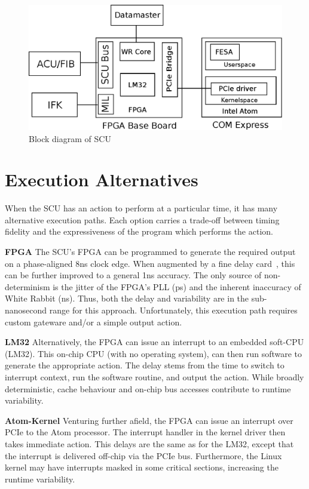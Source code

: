 \documentclass{JAC2003}
\begin{document}
\begin{figure}[t]
   \centering
   \includegraphics*[width=\columnwidth]{WEPD48f2}
   \caption{Block diagram of SCU}
\end{figure}


\section{Execution Alternatives}
When the SCU has an action to perform at a particular time, 
it has many alternative execution paths.
Each option carries a trade-off between timing fidelity and 
the expressiveness of the program which performs the action.

\textbf{FPGA} 
The SCU's FPGA can be programmed to generate the required output
on a phase-aligned 8ns clock edge. 
When augmented by a fine delay card~\cite{cern-fine-delay},
this can be further improved to a general 1ns accuracy.
The only source of non-determinism is the jitter of the FPGA's PLL (ps) 
and the inherent inaccuracy of White Rabbit (ns).
Thus, both the delay and variability are in the sub-nanosecond range 
for this approach.
Unfortunately, this execution path requires custom gateware and/or
a simple output action.

\textbf{LM32} 
Alternatively, the FPGA can issue an interrupt to an embedded soft-CPU (LM32).
This on-chip CPU (with no operating system), 
can then run software to generate the appropriate action.
The delay stems from the time to switch to interrupt context,
run the software routine,
and output the action.
While broadly deterministic,
cache behaviour and on-chip bus accesses contribute to runtime variability.

\textbf{Atom-Kernel}
Venturing further afield,
the FPGA can issue an interrupt over PCIe to the Atom processor.
The interrupt handler in the kernel driver then takes immediate action.
This delays are the same as for the LM32, 
except that the interrupt is delivered off-chip via the PCIe bus.
Furthermore, 
the Linux kernel may have interrupts masked in some critical sections,
increasing the runtime variability.
\end{document}
